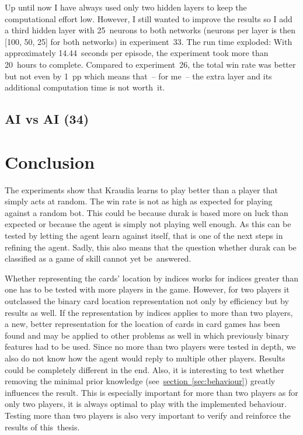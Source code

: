 \documentclass[a4paper,titlepage]{article}
\begin{document}
Up until now I have always used only two hidden layers to keep the computational effort low. However, I still wanted to improve the results so I add a third hidden layer with 25~neurons to both networks (neurons per layer is then [100, 50, 25] for both networks) in experiment~33. The run time exploded: With approximately 14.44~seconds per episode, the experiment took more than 20~hours to complete. Compared to experiment~26, the total win rate was better but not even by 1~pp which means that~-- for me~-- the extra layer and its additional computation time is not worth~it.

\subsection{AI vs AI (34)}

\newpage

\section{Conclusion}

The experiments show that Kraudia learns to play better than a player that simply acts at random. The win rate is not as high as expected for playing against a random bot. This could be because durak is based more on luck than expected or because the agent is simply not playing well enough. As this can be tested by letting the agent learn against itself, that is one of the next steps in refining the agent. Sadly, this also means that the question whether durak can be classified as a game of skill cannot yet be~answered.

Whether representing the cards' location by indices works for indices greater than one has to be tested with more players in the game. However, for two players it outclassed the binary card location representation not only by efficiency but by results as well. If the representation by indices applies to more than two players, a new, better representation for the location of cards in card games has been found and may be applied to other problems as well in which previously binary features had to be used. Since no more than two players were tested in depth, we also do not know how the agent would reply to multiple other players. Results could be completely different in the end. Also, it is interesting to test whether removing the minimal prior knowledge (see~\hyperref[sec:behaviour]{section~\ref*{sec:behaviour}}) greatly influences the result. This is especially important for more than two players as for only two players, it is always optimal to play with the implemented behaviour. Testing more than two players is also very important to verify and reinforce the results of this~thesis.
\end{document}
